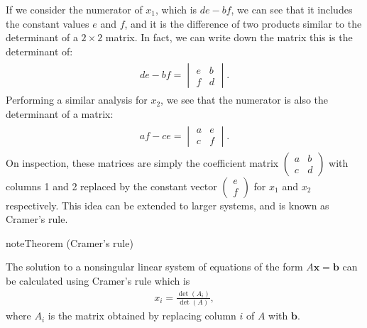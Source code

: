 \documentclass[letterpaper,10pt,english]{jupyterBook}
\begin{document}
\sphinxAtStartPar
If we consider the numerator of \(x_1\), which is \(de - bf\), we can see that it includes the constant values \(e\) and \(f\), and it is the difference of two products \sphinxhyphen{} similar to the determinant of a \(2 \times 2\) matrix. In fact, we can write down the matrix this is the determinant of:
\begin{equation*}
\begin{split} \begin{align*}
    de - bf = \begin{vmatrix} e & b \\ f & d \end{vmatrix}.
\end{align*} \end{split}
\end{equation*}
\sphinxAtStartPar
Performing a similar analysis for \(x_2\), we see that the numerator is also the determinant of a matrix:
\begin{equation*}
\begin{split} \begin{align*}
    af - ce = \begin{vmatrix} a & e \\ c & f \end{vmatrix}.
\end{align*} \end{split}
\end{equation*}
\sphinxAtStartPar
On inspection, these matrices are simply the coefficient matrix \(\begin{pmatrix} a & b \\ c & d \end{pmatrix}\) with columns 1 and 2 replaced by the constant vector \(\begin{pmatrix} e \\ f \end{pmatrix}\) for \(x_1\) and \(x_2\) respectively. This idea can be extended to larger systems, and is known as Cramer’s rule.
\label{None:cramers-rule-theorem}
\begin{sphinxadmonition}{note}{Theorem  (Cramer’s rule)}



\sphinxAtStartPar
The solution to a non\sphinxhyphen{}singular linear system of equations of the form \(A\mathbf{x}=\mathbf{b}\) can be calculated using Cramer’s rule which is
\begin{equation}\label{equation:_pages/2.2_Cramers_rule:cramers-rule-equation}
\begin{split} x_i = \frac{\det(A_i)}{\det(A)}, \end{split}
\end{equation}
\sphinxAtStartPar
where \(A_i\) is the matrix obtained by replacing column \(i\) of \(A\) with \(\mathbf{b}\).
\end{sphinxadmonition}
\end{document}
